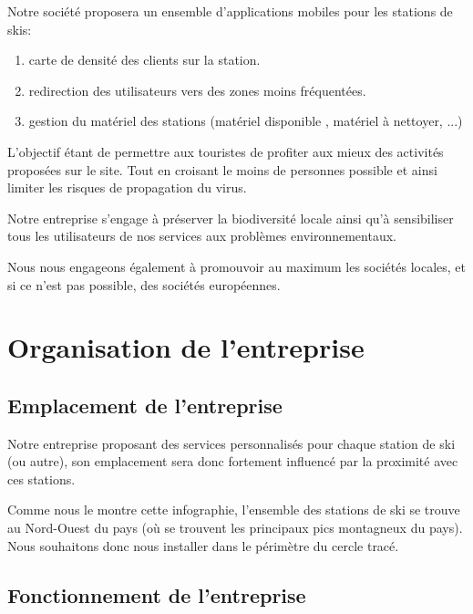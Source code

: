Notre société proposera un ensemble d'applications mobiles pour les stations de skis: \n
\begin{enumerate}
    \item carte de densité des clients sur la station. 
    \item redirection des utilisateurs vers des zones moins fréquentées.
    \item gestion du matériel des stations (matériel disponible , matériel à nettoyer, ...)
\end{enumerate}
  
L'objectif étant de permettre aux touristes de profiter aux mieux des activités proposées sur le site. Tout en croisant le moins de personnes possible et ainsi limiter les risques de propagation du virus. \n   
  
Notre entreprise s'engage à préserver la biodiversité locale ainsi qu'à sensibiliser tous les utilisateurs de nos services aux problèmes environnementaux. \n

Nous nous engageons également à promouvoir au maximum les sociétés locales, et si ce n'est pas possible, des sociétés européennes. 







\chapter{Organisation de l'entreprise}



\section{Emplacement de l'entreprise}

Notre entreprise proposant des services personnalisés pour chaque station de ski (ou autre), son emplacement sera donc fortement influencé par la proximité avec ces stations.\n 


Comme nous le montre cette infographie, l'ensemble des stations de ski se trouve au Nord-Ouest du pays (où se trouvent les principaux pics montagneux du pays). Nous souhaitons donc nous installer dans le périmètre du cercle tracé. \\




\section{Fonctionnement de l'entreprise}

